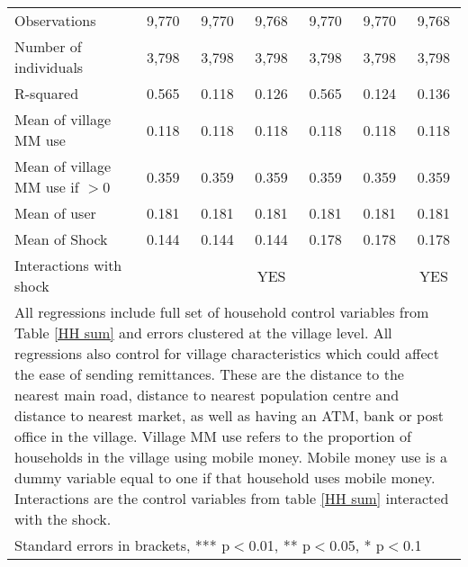 \begin{table}
\begin{adjustwidth}{-1in}{-1in}
\begin{tabular}{lcccccc}
Observations & 9,770 & 9,770 & 9,768 & 9,770 & 9,770 & 9,768 \\
Number of individuals  & 3,798 & 3,798 & 3,798 & 3,798 & 3,798 & 3,798 \\
R-squared & 0.565 & 0.118 & 0.126 & 0.565 & 0.124 & 0.136 \\ \hline
Mean of village MM use  & 0.118 & 0.118 & 0.118 & 0.118 & 0.118 & 0.118 \\
Mean of village MM use if $>0$ & 0.359 & 0.359 & 0.359 & 0.359 & 0.359 & 0.359 \\
Mean of user & 0.181 & 0.181 & 0.181 & 0.181 & 0.181 & 0.181 \\
Mean of Shock & 0.144 & 0.144 & 0.144 & 0.178 & 0.178 & 0.178 \\
Interactions with shock &  &  & YES &  &  & YES \\ \hline
\multicolumn{7}{p{15cm}}{All regressions include full set of household control variables from Table \ref{HH sum} and errors clustered at the village level. All regressions also control for village characteristics which could affect the ease of sending remittances. These are the distance to the nearest main road, distance to nearest population centre and distance to nearest market, as well as having an ATM, bank or post office in the village. Village MM use refers to the proportion of households in the village using mobile money. Mobile money use is a dummy variable equal to one if that household uses mobile money. Interactions are the control variables from table \ref{HH sum} interacted with the shock.} \\
\multicolumn{7}{l}{ Standard errors in brackets, *** p$<$0.01, ** p$<$0.05, * p$<$0.1} 
\end{tabular}
 \end{adjustwidth}
 \end{table}
 
